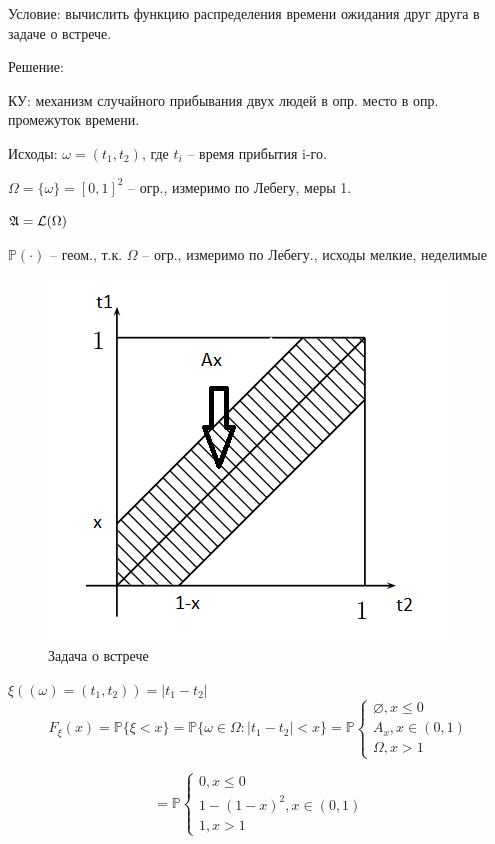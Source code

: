 \begin{zad}
	Условие: вычислить функцию распределения времени ожидания друг друга в задаче о встрече.
	
	Решение:
	
	КУ: механизм случайного прибывания двух людей в опр. место в опр. промежуток времени.
	
	Исходы: $\omega = (t_1,t_2)$, где $t_i$ -- время прибытия i-го.
	
	$\Omega = \{\omega\} = [0,1]^{2}$ -- огр., измеримо по Лебегу, меры 1.
	
	$\mathfrak{A} = \mathcal{L}(\Omega)$
	
	$\mathbb{P}(\cdot)$ -- геом., т.к. $\Omega$ -- огр., измеримо по Лебегу., исходы мелкие, неделимые

	\begin{figure}[H]
      \centering
      \includegraphics[width=0.5\linewidth]{img/vstr1.png}
      \caption{Задача о встрече}
    \end{figure}
	
	$\xi((\omega)=(t_1,t_2)) = |t_1 - t_2|$	 
	\begin{equation*}
		F_{\xi}(x) = \mathbb{P} \{ \xi < x \} = \mathbb{P} \{ \omega \in \Omega : |t_1 - t_2| < x \} = \mathbb{P}
			\begin{cases}
				\varnothing , x \leq 0 \\			
				A_x, x \in (0,1)\\ 
				\Omega, x > 1
			\end{cases}
	\end{equation*}
 
	\begin{equation*}
		=\mathbb{P}
			\begin{cases}
				0 , x \leq 0 \\			
				1-(1-x)^2, x \in (0,1)\\
				1, x > 1
			\end{cases}
	\end{equation*}
\end{zad}

